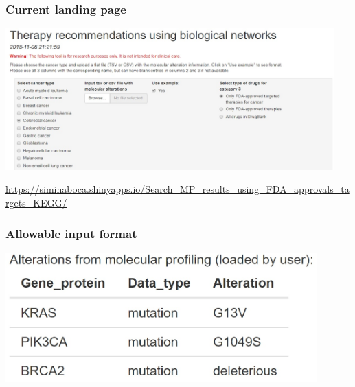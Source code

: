 \documentclass{beamer}
\begin{document}
\begin{frame}
\frametitle{Current landing page}

\includegraphics[width=0.95\textwidth, center]{Landing_page.jpg}

\vspace{0.4cm}

\url{https://siminaboca.shinyapps.io/Search_MP_results_using_FDA_approvals_targets_KEGG/}

\end{frame}


\begin{frame}
\frametitle{Allowable input format}

\includegraphics[width=0.90\textwidth, center]{Allowable_input.jpg}

\end{frame}

\end{document}
